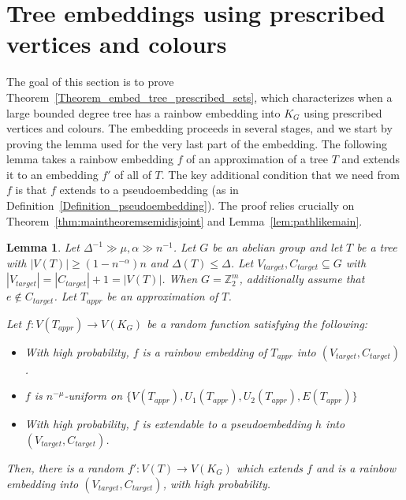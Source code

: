 \documentclass[a4paper,11pt,hidelinks]{amsart}
\newtheorem{lemma}[theorem]{Lemma}
\theoremstyle{definition}
\newcommand{\AM}[1]{\textcolor{blue}{[#1]}}
\begin{document}
\section{Tree embeddings using prescribed vertices and colours}\label{sec:corelemma}
The goal of this section is to prove Theorem~\ref{Theorem_embed_tree_prescribed_sets}, which characterizes when a large bounded degree tree has a rainbow embedding into $K_G$ using prescribed vertices and colours. The embedding proceeds in several stages, and we start by proving the lemma used for the very last part of the embedding. The following lemma takes a rainbow embedding $f$ of an approximation of a tree $T$ and extends it to an embedding $f'$ of all of $T$. The key additional condition that we need from $f$ is that $f$ extends to a pseudoembedding (as in Definition~\ref{Definition_pseudoembedding}). The proof relies crucially on Theorem~\ref{thm:maintheoremsemidisjoint} and Lemma~\ref{lem:pathlikemain}. 
\begin{lemma}\label{Lemma_final_extension}
Let $\Delta^{-1}\gg \mu,\alpha\gg n^{-1}$.
Let $G$ be an abelian group and let $T$ be a tree with $|V(T)|\geq(1-n^{-\alpha})n$ and $\Delta(T)\leq \Delta$.
Let $V_{target},C_{target}\subseteq G$ with $|V_{target}|=|C_{target}|+1=|V(T)|$. When $G=\mathbb{Z}_2^m$, additionally assume that $e\not\in C_{target}$. Let $T_{appr}$ be an approximation of $T$.

Let $f:V(T_{appr})\to V(K_G)$ be a random function satisfying the following:
\begin{itemize}
\item With high probability, $f$ is a rainbow embedding of $T_{appr}$ into $(V_{target}, C_{target})$.
\item $f$ is $n^{-\mu}$-uniform on $\{V(T_{appr}), U_1(T_{appr}), U_2(T_{appr}), E(T_{appr})\}$ %
\item With high probability, $f$ is extendable to a pseudoembedding $h$ into $(V_{target}, C_{target})$.
\end{itemize}
 Then, there is a random $f':V(T)\to  V(K_G)$ which extends $f$ and is a rainbow embedding into $(V_{target},C_{target})$, with high probability.
\end{lemma}
\end{document}
